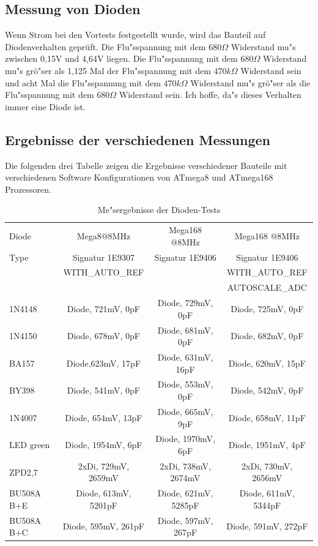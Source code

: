 \subsection{Messung von Dioden}
\label{sec:diode}
Wenn Strom bei den Vortests festgestellt wurde, wird das Bauteil auf Diodenverhalten gepr\"uft.
Die Flu"sspannung mit dem \(680\Omega\) Widerstand mu"s zwischen 0,15V und 4,64V liegen.
Die Flu"sspannung mit dem \(680\Omega\) Widerstand mu"s gr\"o"ser als 1,125 Mal der Flu"sspannung mit dem
 \(470k\Omega\) Widerstand sein und acht Mal die Flu"sspannung mit dem \(470k\Omega\) Widerstand mu"s
gr\"o"ser als die Flu"sspannung mit dem \(680\Omega\) Widerstand sein.
Ich hoffe, da"s dieses Verhalten immer eine Diode ist.

\subsection{Ergebnisse der verschiedenen Messungen}
Die folgenden drei Tabelle zeigen die Ergebnisse verschiedener Bauteile mit
verschiedenen Software Konfigurationen von ATmega8 und ATmega168 Prozessoren.

\begin{table}[H]
  \begin{center}
    \begin{tabular}{| l | c | c | c |}
    \hline
     Diode & Mega8@8MHz & Mega168 @8MHz & Mega168 @8MHz \\
     Type  & Signatur 1E9307 & Signatur 1E9406 & Signatur 1E9406 \\
           & WITH\_AUTO\_REF &  & WITH\_AUTO\_REF \\
           &                 &  & AUTOSCALE\_ADC \\
    \hline
    \hline
1N4148 & Diode, 721mV, 0pF & Diode, 729mV, 0pF & Diode, 725mV, 0pF\\
    \hline
1N4150 & Diode, 678mV, 0pF & Diode, 681mV, 0pF & Diode, 682mV, 0pF\\
    \hline
BA157 & Diode,623mV, 17pF & Diode, 631mV, 16pF & Diode, 620mV, 15pF\\
    \hline
BY398 & Diode, 541mV, 0pF & Diode, 553mV, 0pF & Diode, 542mV, 0pF\\
    \hline
1N4007 & Diode, 654mV, 13pF & Diode, 665mV, 9pF & Diode, 658mV, 11pF\\
    \hline
LED green & Diode, 1954mV, 6pF & Diode, 1970mV, 6pF & Diode, 1951mV, 4pF\\
    \hline
ZPD2,7 & 2xDi, 729mV, 2659mV & 2xDi, 738mV, 2674mV & 2xDi, 730mV, 2656mV \\
    \hline
BU508A B+E & Diode, 613mV, 5201pF & Diode, 621mV, 5285pF & Diode, 611mV, 5344pF\\
    \hline
BU508A B+C & Diode, 595mV, 261pF & Diode, 597mV, 267pF & Diode, 591mV, 272pF\\
    \hline
    \end{tabular}
  \end{center}
  \caption{Me"sergebnisse der Dioden-Tests}
  \label{tab:diodes} 
\end{table}

